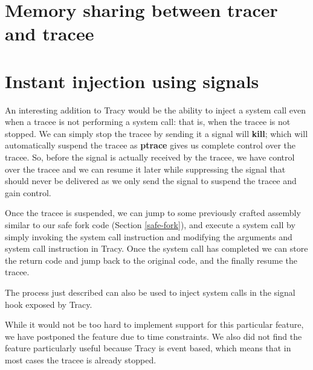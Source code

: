 \documentclass[a4paper, 10pt]{report}
\begin{document}
\section{Memory sharing between tracer and tracee}
\label{memory-share}


\section{Instant injection using signals}
\label{instant-inject}

An interesting addition to Tracy would be the ability to inject a system call
even when a tracee is not performing a system call: that is, when the tracee
is not stopped. We can simply stop the tracee by sending it a signal will
\textbf{kill}; which will automatically suspend the tracee as
\textbf{ptrace} gives us complete control over the tracee.
So, before the signal is actually received by the tracee, we have control
over the tracee and we can resume it later while suppressing the signal that
should never be delivered as we only send the signal to suspend the tracee and
gain control.

Once the tracee is suspended, we can jump to some previously crafted assembly
similar to our safe fork code (Section \ref{safe-fork}), and execute a system
call by simply invoking the system call instruction and modifying the
arguments and system call instruction in Tracy. Once the system call
has completed we can store the return code and jump back to the original code,
and the finally resume the tracee.

The process just described can also be used to inject system calls
in the signal hook exposed by Tracy.

While it would not be too hard to implement support for this particular
feature, we have postponed the feature due to time constraints. We also
did not find the feature particularly useful because Tracy is event based,
which means that in most cases the tracee is already stopped.



\end{document}
